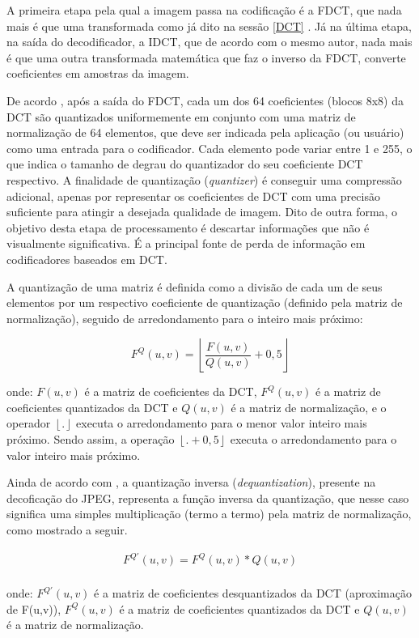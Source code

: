  A primeira etapa pela qual a imagem passa na codificação é a FDCT, que nada mais é que uma transformada como já dito na sessão \ref{DCT} . Já na última etapa, na saída do decodificador, a IDCT, que de acordo com o mesmo autor, nada mais é que uma outra transformada matemática que faz o inverso da FDCT, converte coeficientes em amostras da imagem. 

De acordo , após a saída do FDCT, cada um dos 64 coeficientes (blocos 8x8) da DCT  são quantizados uniformemente em conjunto com uma matriz de normalização de 64 elementos, que deve ser indicada pela aplicação (ou usuário) como uma entrada para o codificador. Cada elemento pode variar entre 1 e 255, o que indica o tamanho de degrau do quantizador do seu coeficiente DCT respectivo. A finalidade de quantização (\textit{quantizer}) é conseguir uma compressão adicional, apenas por representar os coeficientes de DCT com uma precisão suficiente para atingir a desejada qualidade de imagem. Dito de outra forma, o objetivo desta etapa de processamento é descartar informações que não é visualmente significativa. É a principal fonte de perda de informação em codificadores baseados em DCT.

A quantização de uma matriz é definida como a divisão de cada um de seus elementos por um respectivo coeficiente de quantização (definido pela matriz de normalização), seguido de arredondamento para o inteiro mais próximo:
\vspace{-3mm}
\begin{flushleft}
	\begin{equation}
		F^Q(u,v)=\left \lfloor \frac{F(u,v)}{Q(u,v)} +0,5 \right \rfloor
	\end{equation}
\end{flushleft}
onde:
			$F(u,v)$ é a matriz de coeficientes da DCT,
			$F^Q(u,v)$ é a matriz de coeficientes quantizados da DCT e
			$Q(u,v)$ é a matriz de normalização,
			e o operador $\left \lfloor . \right \rfloor$ executa o arredondamento para o menor valor inteiro mais próximo. Sendo assim, a operação $\left \lfloor . +0,5 \right \rfloor$ executa o arredondamento para o valor inteiro mais próximo.

			

Ainda de acordo com \cite{wallace1991jpeg}, a quantização inversa (\textit{dequantization}), presente na decoficação do JPEG, representa a função inversa da quantização, que nesse caso significa uma simples multiplicação (termo a termo) pela matriz de normalização, como mostrado a seguir.
\vspace{-5mm}
\begin{center}
	\begin{equation}
		\begin{split}
			F^{Q'}(u,v) =F^Q(u,v) * Q(u,v) \\
		\end{split}
	\end{equation}
\end{center} 
onde:
			$F^{Q'}(u,v)$ é a matriz de coeficientes desquantizados da DCT (aproximação de F(u,v)), 
			$F^Q(u,v)$ é a matriz de coeficientes quantizados da DCT e
			$Q(u,v)$ é a matriz de normalização.

